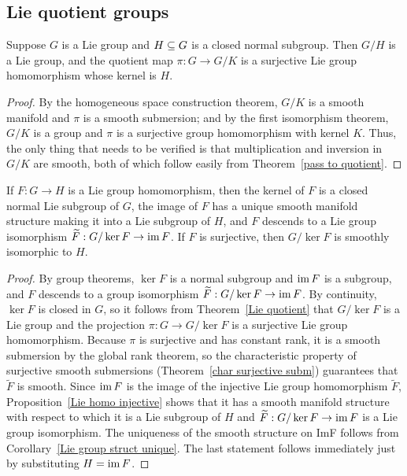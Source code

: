 \subsection{Lie quotient groups}
\begin{theorem}\label{Lie quotient}
Suppose $G$ is a Lie group and $H\subseteq G$ is a closed normal subgroup. Then $G/H$ is a Lie group, and the quotient map $\pi:G\to G/K$ is a surjective Lie group homomorphism whose kernel is $H$.
\end{theorem}
\begin{proof}
By the homogeneous space construction theorem, $G/K$ is a smooth manifold and $\pi$ is a smooth submersion; and by the first isomorphism theorem, $G/K$ is a group and $\pi$ is a surjective group homomorphism with kernel $K$. Thus, the only thing that needs to be verified is that multiplication and inversion in $G/K$ are smooth, both of which follow easily from Theorem~\ref{pass to quotient}.
\end{proof}
\begin{theorem}\label{Lie first iso}
If $F:G\to H$ is a Lie group homomorphism, then the kernel of $F$ is a closed normal Lie subgroup of $G$, the image of $F$ has a unique smooth manifold structure making it into a Lie subgroup of $H$, and $F$ descends to a Lie group isomorphism $\widetilde{F}:G/\ker F\to\mathrm{im}\, F$. If $F$ is surjective, then $G/\ker F$ is smoothly isomorphic to $H$.
\end{theorem}
\begin{proof}
By group theorems, $\ker F$ is a normal subgroup and $\mathrm{im}\, F$ is a subgroup, and $F$ descends to a group isomorphism $\widetilde{F}:G/\ker F\to\mathrm{im}\, F$. By continuity, $\ker F$ is closed in $G$, so it follows from Theorem~\ref{Lie quotient} that $G/\ker F$ is a Lie group and the projection $\pi:G\to G/\ker F$ is a surjective Lie group homomorphism. Because $\pi$ is surjective and has constant rank, it is a smooth submersion by the global rank theorem, so the characteristic property of surjective smooth submersions (Theorem~\ref{char surjective subm}) guarantees that $\widetilde{F}$ is smooth. Since $\mathrm{im}\, F$ is the image of the injective Lie group homomorphism $\widetilde{F}$, Proposition~\ref{Lie homo injective} shows that it has a smooth manifold structure with respect to which it is a Lie subgroup of $H$ and $\widetilde{F}:G/\ker F\to\mathrm{im}\, F$ is a Lie group isomorphism. The uniqueness of the smooth structure on ImF follows from Corollary~\ref{Lie group struct unique}. The last statement follows immediately just by substituting $H=\mathrm{im}\, F$.
\end{proof}
